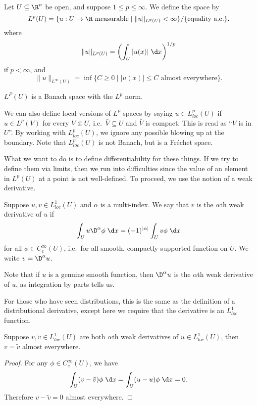 \documentclass[a4paper]{article}
\begin{document}
Let $U \subseteq \R^n$ be open, and suppose $1 \leq p \leq \infty$. We define the space  by
\[
  L^p(U) = \{u: U \to \R\text{ measurable} \mid \|u\|_{L^p(U)} < \infty\}/\{\text{equality a.e.}\}.
\]
where
\[
  \|u\|_{L^p(U)} = \left(\int_U |u(x)|\;\d x\right)^{1/p}
\]
if $p < \infty$, and
\[
  \|u\|_{L^\infty(U)} = \inf \{C \geq 0 \mid |u(x)| \leq C\text{ almost everywhere}\}.
\]
\begin{thm}
  $L^P(U)$ is a Banach space with the $L^p$ norm.\qedsym
\end{thm}
We can also define local versions of $L^p$ spaces by saying $u \in L^p_{loc}(U)$ if $u \in L^p(V)$ for every $V \Subset U$, i.e.\ $\bar{V} \subseteq U$ and $\bar{V}$ is compact. This is read as ``$V$ is  in $U$''. By working with $L^p_{loc}(U)$, we ignore any possible blowing up at the boundary. Note that $L^p_{loc}(U)$ is not Banach, but is a Fr\'echet space.

What we want to do is to define differentiability for these things. If we try to define them via limits, then we run into difficulties since the value of an element in $L^p(U)$ at a point is not well-defined. To proceed, we use the notion of a weak derivative.

\begin{defi}
  Suppose $u, v \in L^1_{loc}(U)$ and $\alpha$ is a multi-index. We say that $v$ is the $\alpha$th weak derivative of $u$ if
  \[
    \int_U u \D^\alpha \phi \;\d x = (-1)^{|\alpha|} \int_U v \phi\;\d x
  \]
  for all $\phi \in C^\infty_c(U)$, i.e.\ for all smooth, compactly supported function on $U$. We write $v = \D^\alpha u$.
\end{defi}

Note that if $u$ is a genuine smooth function, then $\D^\alpha u$ is the $\alpha$th weak derivative of $u$, as integration by parts tells us.

For those who have seen distributions, this is the same as the definition of a distributional derivative, except here we require that the derivative is an $L^1_{loc}$ function.

\begin{lemma}
  Suppose $v, \tilde{v} \in L^1_{loc}(U)$ are both $\alpha$th weak derivatives of $u \in L^1_{loc}(U)$, then $v = \tilde{v}$ almost everywhere.
\end{lemma}

\begin{proof}
  For any $\phi \in C^\infty_c(U)$, we have
  \[
    \int_U (v - \tilde{v}) \phi \;\d x = \int_U (u - u) \phi\;\d x = 0.
  \]
  Therefore $v - \tilde{v} = 0$ almost everywhere.
\end{proof}
\end{document}
